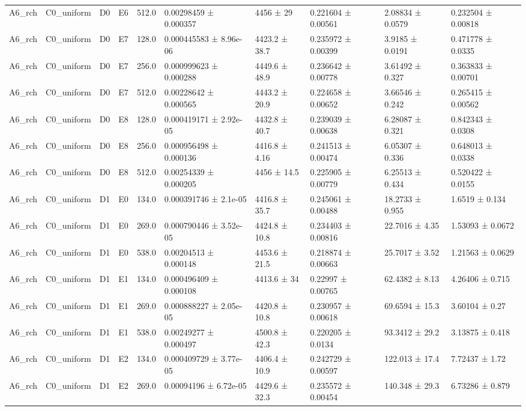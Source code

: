 \begin{table}
\begin{tabular}{llllllllll}
A6\_rch & C0\_uniform & D0 & E6 & 512.0 & 0.00298459 ± 0.000357 & 4456 ± 29 & 0.221604 ± 0.00561 & 2.08834 ± 0.0579 & 0.232504 ± 0.00818 \\
A6\_rch & C0\_uniform & D0 & E7 & 128.0 & 0.000445583 ± 8.96e-06 & 4423.2 ± 38.7 & 0.235972 ± 0.00399 & 3.9185 ± 0.0191 & 0.471778 ± 0.0335 \\
A6\_rch & C0\_uniform & D0 & E7 & 256.0 & 0.000999623 ± 0.000288 & 4449.6 ± 48.9 & 0.236642 ± 0.00778 & 3.61492 ± 0.327 & 0.363833 ± 0.00701 \\
A6\_rch & C0\_uniform & D0 & E7 & 512.0 & 0.00228642 ± 0.000565 & 4443.2 ± 20.9 & 0.224658 ± 0.00652 & 3.66546 ± 0.242 & 0.265415 ± 0.00562 \\
A6\_rch & C0\_uniform & D0 & E8 & 128.0 & 0.000419171 ± 2.92e-05 & 4432.8 ± 40.7 & 0.239039 ± 0.00638 & 6.28087 ± 0.321 & 0.842343 ± 0.0308 \\
A6\_rch & C0\_uniform & D0 & E8 & 256.0 & 0.000956498 ± 0.000136 & 4416.8 ± 4.16 & 0.241513 ± 0.00474 & 6.05307 ± 0.336 & 0.648013 ± 0.0338 \\
A6\_rch & C0\_uniform & D0 & E8 & 512.0 & 0.00254339 ± 0.000205 & 4456 ± 14.5 & 0.225905 ± 0.00779 & 6.25513 ± 0.434 & 0.520422 ± 0.0155 \\
A6\_rch & C0\_uniform & D1 & E0 & 134.0 & 0.000391746 ± 2.1e-05 & 4416.8 ± 35.7 & 0.245061 ± 0.00488 & 18.2733 ± 0.955 & 1.6519 ± 0.134 \\
A6\_rch & C0\_uniform & D1 & E0 & 269.0 & 0.000790446 ± 3.52e-05 & 4424.8 ± 10.8 & 0.234403 ± 0.00816 & 22.7016 ± 4.35 & 1.53093 ± 0.0672 \\
A6\_rch & C0\_uniform & D1 & E0 & 538.0 & 0.00204513 ± 0.000148 & 4453.6 ± 21.5 & 0.218874 ± 0.00663 & 25.7017 ± 3.52 & 1.21563 ± 0.0629 \\
A6\_rch & C0\_uniform & D1 & E1 & 134.0 & 0.000496409 ± 0.000108 & 4413.6 ± 34 & 0.22997 ± 0.00765 & 62.4382 ± 8.13 & 4.26406 ± 0.715 \\
A6\_rch & C0\_uniform & D1 & E1 & 269.0 & 0.000888227 ± 2.05e-05 & 4420.8 ± 10.8 & 0.230957 ± 0.00618 & 69.6594 ± 15.3 & 3.60104 ± 0.27 \\
A6\_rch & C0\_uniform & D1 & E1 & 538.0 & 0.00249277 ± 0.000497 & 4500.8 ± 42.3 & 0.220205 ± 0.0134 & 93.3412 ± 29.2 & 3.13875 ± 0.418 \\
A6\_rch & C0\_uniform & D1 & E2 & 134.0 & 0.000409729 ± 3.77e-05 & 4406.4 ± 10.9 & 0.242729 ± 0.00597 & 122.013 ± 17.4 & 7.72437 ± 1.72 \\
A6\_rch & C0\_uniform & D1 & E2 & 269.0 & 0.00094196 ± 6.72e-05 & 4429.6 ± 32.3 & 0.235572 ± 0.00454 & 140.348 ± 29.3 & 6.73286 ± 0.879 \\

\end{tabular}
\end{table}
